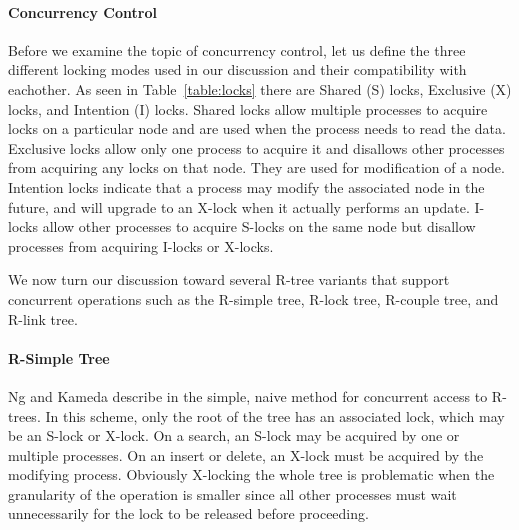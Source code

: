 \paragraph{Concurrency Control} 
Before we examine the topic of concurrency control, let us define the three
different locking modes used in our discussion and their compatibility with
eachother. As seen in Table~\ref{table:locks} there are Shared (S) locks, 
Exclusive (X) locks, and Intention (I) locks. Shared locks allow multiple 
processes to acquire locks on a particular node and are used when the process
needs to read the data. Exclusive locks allow only one process to acquire it
and disallows other processes from acquiring any locks on that node. They are 
used for modification of a node. Intention locks indicate that a process
may modify the associated node in the future, and will upgrade to an X-lock 
when it actually performs an update. I-locks allow other processes to acquire
S-locks on the same node but disallow processes from acquiring I-locks or X-locks.

\begin{table}[hb]
\end{table}
	
We now turn our discussion toward several R-tree variants that support concurrent 
operations such as the R-simple tree, R-lock tree, R-couple 
tree\cite{ng1993concurrent}, and R-link tree\cite{kornacker1995high, ng1994r}. 

\paragraph{R-Simple Tree} Ng and Kameda describe in \cite{ng1993concurrent}
the simple, naive method for concurrent access to R-trees. In this scheme, only 
the root of the tree has an associated lock, which may be an S-lock or X-lock. 
On a search, an S-lock may be acquired by one or 
multiple processes. On an insert or delete, an X-lock must be acquired by the 
modifying process. Obviously X-locking the whole tree is problematic when the 
granularity of the operation is smaller since all other processes must wait 
unnecessarily for the lock to be released before proceeding. 

